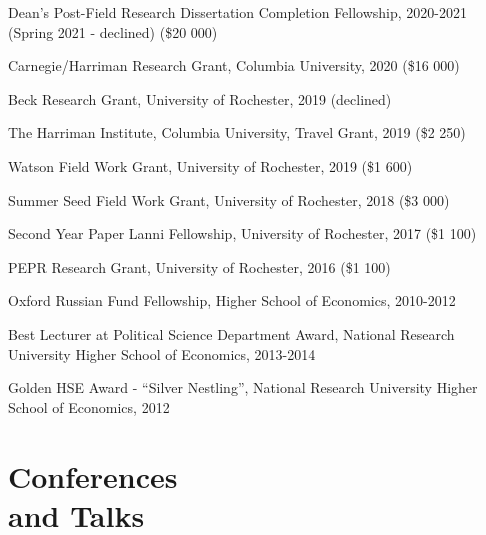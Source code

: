 \documentclass[margin,line,10.95pt]{res}
\begin{document}
\begin{resume}
\vspace*{-4.5mm}

Dean's Post-Field Research Dissertation Completion Fellowship, 2020-2021 (Spring 2021 - declined) (\$20 000)
\vspace*{-4.5mm}

Carnegie/Harriman Research Grant, Columbia University, 2020 (\$16 000)
\vspace*{-4.5mm}

Beck Research Grant, University of Rochester, 2019 (declined)
\vspace*{-4.5mm}

The Harriman Institute, Columbia University, Travel Grant, 2019 (\$2 250)
\vspace*{-4.5mm}

Watson Field Work Grant, University of Rochester, 2019 (\$1 600)
\vspace*{-4.5mm}

Summer Seed Field Work Grant, University of Rochester, 2018 (\$3 000)
\vspace*{-4.5mm}

Second Year Paper Lanni Fellowship, University of Rochester, 2017 (\$1 100)
\vspace*{-4.5mm}

PEPR Research Grant, University of Rochester, 2016 (\$1 100)
\vspace*{-4.5mm}


Oxford Russian Fund Fellowship, Higher School of Economics, 2010-2012 
\vspace*{-2.5mm}

Best Lecturer at Political Science Department Award, National Research University Higher School of Economics, 2013-2014 
\vspace*{-4.5mm}

Golden HSE Award - ``Silver Nestling'', National Research University Higher School of Economics, 2012
\vspace*{-2.5mm}


\section{\sc Conferences \\ and Talks}


\end{resume}
\end{document}
